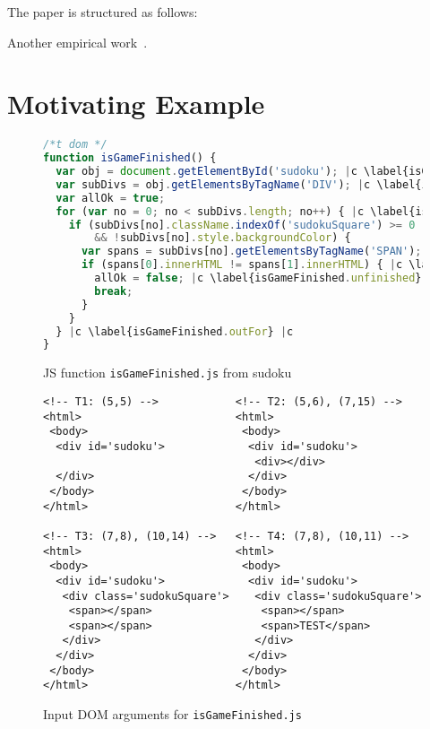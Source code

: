 \documentclass[sigconf,review, anonymous]{acmart}
\begin{document}
The paper is structured as follows: 

Another empirical work~\cite{richards2010analysis}.

\section{Motivating Example}
\label{sec.example}

\begin{figure}[t]
  \begin{lstlisting}[style=htmlcssjs,language=JavaScript]
/*t dom */
function isGameFinished() {
  var obj = document.getElementById('sudoku'); |c \label{isGameFinished.getSudoku} |c
  var subDivs = obj.getElementsByTagName('DIV'); |c \label{isGameFinished.getDivs} |c
  var allOk = true;
  for (var no = 0; no < subDivs.length; no++) { |c \label{isGameFinished.inFor.begin} |c
    if (subDivs[no].className.indexOf('sudokuSquare') >= 0 |c \label{isGameFinished.if1.begin} |c 
        && !subDivs[no].style.backgroundColor) { 
      var spans = subDivs[no].getElementsByTagName('SPAN');
      if (spans[0].innerHTML != spans[1].innerHTML) { |c \label{isGameFinished.if2.begin} |c
        allOk = false; |c \label{isGameFinished.unfinished} |c
        break; 
      }
    }
  } |c \label{isGameFinished.outFor} |c
}
\end{lstlisting}
  \caption{JS function \texttt{isGameFinished.js} from sudoku}
  \label{code.isGameFinished}
\end{figure}

\begin{figure}[t]
  \begin{lstlisting}[style=htmlcssjs, language=HTML5]
<!-- T1: (5,5) -->            <!-- T2: (5,6), (7,15) -->
<html>                        <html>
 <body>                        <body>
  <div id='sudoku'>             <div id='sudoku'>
                                 <div></div>                           
  </div>                        </div> 
 </body>                       </body>    
</html>                       </html>  

<!-- T3: (7,8), (10,14) -->   <!-- T4: (7,8), (10,11) -->
<html>                        <html>
 <body>                        <body>
  <div id='sudoku'>             <div id='sudoku'>
   <div class='sudokuSquare'>    <div class='sudokuSquare'>
    <span></span>                 <span></span> 
    <span></span>                 <span>TEST</span>
   </div>                        </div> 
  </div>                        </div>
 </body>                       </body>
</html>                       </html>
  \end{lstlisting}
  \caption{Input DOM arguments for \texttt{isGameFinished.js}}
  \label{fig.isGameFinished.tests}
\end{figure}
\end{document}

